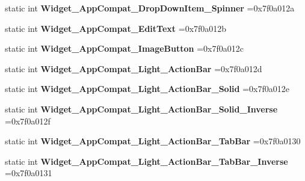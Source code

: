 \begin{DoxyCompactItemize}
static int {\bfseries Widget\+\_\+\+App\+Compat\+\_\+\+Drop\+Down\+Item\+\_\+\+Spinner} =0x7f0a012a
\item 
\mbox{\label{classandroid_1_1support_1_1v4_1_1R_1_1style_aa3f0cd40ff6b4c345108f66021dc4c04}} 
static int {\bfseries Widget\+\_\+\+App\+Compat\+\_\+\+Edit\+Text} =0x7f0a012b
\item 
\mbox{\label{classandroid_1_1support_1_1v4_1_1R_1_1style_aff47c653bedd4085e4ff1dc0f149562c}} 
static int {\bfseries Widget\+\_\+\+App\+Compat\+\_\+\+Image\+Button} =0x7f0a012c
\item 
\mbox{\label{classandroid_1_1support_1_1v4_1_1R_1_1style_a12aa2bee0ba4481009ad443ca9eeef82}} 
static int {\bfseries Widget\+\_\+\+App\+Compat\+\_\+\+Light\+\_\+\+Action\+Bar} =0x7f0a012d
\item 
\mbox{\label{classandroid_1_1support_1_1v4_1_1R_1_1style_a148000b2736facbd7f27ab2fa40bba2f}} 
static int {\bfseries Widget\+\_\+\+App\+Compat\+\_\+\+Light\+\_\+\+Action\+Bar\+\_\+\+Solid} =0x7f0a012e
\item 
\mbox{\label{classandroid_1_1support_1_1v4_1_1R_1_1style_adf845207e0d84f39771586116b9325f9}} 
static int {\bfseries Widget\+\_\+\+App\+Compat\+\_\+\+Light\+\_\+\+Action\+Bar\+\_\+\+Solid\+\_\+\+Inverse} =0x7f0a012f
\item 
\mbox{\label{classandroid_1_1support_1_1v4_1_1R_1_1style_a034e03855814f556d2636ca385e68398}} 
static int {\bfseries Widget\+\_\+\+App\+Compat\+\_\+\+Light\+\_\+\+Action\+Bar\+\_\+\+Tab\+Bar} =0x7f0a0130
\item 
\mbox{\label{classandroid_1_1support_1_1v4_1_1R_1_1style_a14ca83fe5babb1c3a3e7833882aae329}} 
static int {\bfseries Widget\+\_\+\+App\+Compat\+\_\+\+Light\+\_\+\+Action\+Bar\+\_\+\+Tab\+Bar\+\_\+\+Inverse} =0x7f0a0131
\item 
\mbox{\label{classandroid_1_1support_1_1v4_1_1R_1_1style_af8cd326b67085af5673703492e41632b}} 

\end{DoxyCompactItemize}
